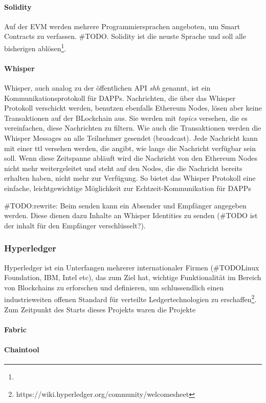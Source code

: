 \paragraph{Solidity}
Auf der \acrfull{EVM} werden mehrere Programmiersprachen angeboten, um Smart Contracts zu verfassen. \#TODO. Solidity ist die neuste Sprache und soll alle bisherigen ablösen\footnote{}.
\paragraph{Whisper}
\label{para:Whisper}
Whisper, auch analog zu der öffentlichen API \emph{shh} genannt, ist ein Kommunikationsprotokoll für \acrfull{DAPPs}. Nachrichten, die über das Whisper Protokoll verschickt werden, benutzen ebenfalls Ethereum Nodes, lösen aber keine Transaktionen auf der BLockchain aus. Sie werden mit \emph{topics} versehen, die es vereinfachen, diese Nachrichten zu filtern. Wie auch die Transaktionen werden die Whisper Messages an alle Teilnehmer gesendet (broadcast). Jede Nachricht kann mit einer \acrfull{ttl} versehen werden, die angibt, wie lange die Nachricht verfügbar sein soll. Wenn diese Zeitspanne abläuft wird die Nachricht von den Ethereum Nodes nicht mehr weitergeleitet und steht auf den Nodes, die die Nachricht bereits erhalten haben, nicht mehr zur Verfügung. So bietet das Whisper Protokoll eine einfache, leichtgewichtige Möglichkeit zur Echtzeit-Kommunikation für \acrshort{DAPPs}

\#TODO:rewrite: Beim senden kann ein Absender und Empfänger angegeben werden. Diese dienen dazu Inhalte an Whisper Identities zu senden (\#TODO ist der inhalt für den Empfänger verschlüsselt?).

\subsubsection{Hyperledger}
Hyperledger ist ein Unterfangen mehrerer internationaler Firmen (\#TODOLinux Foundation, IBM, Intel etc), das zum Ziel hat, wichtige Funktionalität im Bereich von Blockchains zu erforschen und definieren, um schlussendlich einen industrieweiten offenen Standard für verteilte Ledgertechnologien zu erschaffen\footnote{https://wiki.hyperledger.org/community/welcomesheet}.
\\Zum Zeitpunkt des Starts dieses Projekts waren die Projekte 
\paragraph{Fabric}
\paragraph{Chaintool}


